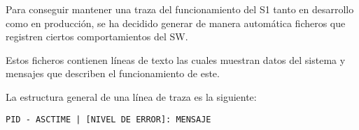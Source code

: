 Para conseguir mantener una traza del funcionamiento del \ac{S1} tanto en desarrollo como en producción, se ha decidido generar de manera automática ficheros que registren ciertos comportamientos del \ac{SW}.

Estos ficheros contienen líneas de texto las cuales muestran datos del sistema y mensajes que describen el funcionamiento de este.

La estructura general de una línea de traza es la siguiente:
\begin{center}
    {\large \texttt{PID - ASCTIME | [NIVEL DE ERROR]: MENSAJE}}
\end{center}


